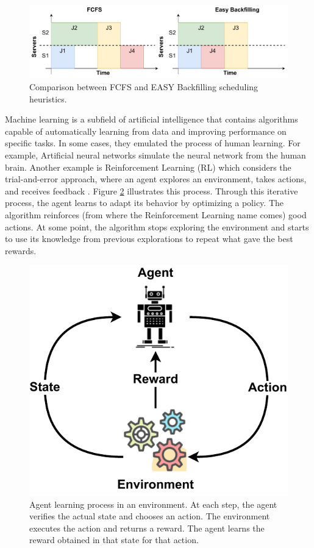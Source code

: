 \begin{figure}[!htb]
    \centering
    \includegraphics[scale=0.6]{Images/Related_works/backfilling.pdf}
    \caption{Comparison between FCFS and EASY Backfilling scheduling heuristics.}
    \label{fig:backfilling}
\end{figure}

Machine learning is a subfield of artificial intelligence that contains algorithms capable of automatically learning from data and improving performance on specific tasks. In some cases, they emulated the process of human learning. For example, Artificial neural networks simulate the neural network from the human brain. Another example is Reinforcement Learning (RL) which considers the trial-and-error approach, where an agent explores an environment, takes actions, and receives feedback \cite{kaelbling1996reinforcement}. Figure \ref{fig:reinforcement} illustrates this process. Through this iterative process, the agent learns to adapt its behavior by optimizing a policy. The algorithm reinforces (from where the Reinforcement Learning name comes) good actions. At some point, the algorithm stops exploring the environment and starts to use its knowledge from previous explorations to repeat what gave the best rewards. 

\begin{figure}[!htb]
    \centering
    \includegraphics[scale=0.6]{Images/Related_works/Reinforcement_learning.pdf}
    \caption{Agent learning process in an environment. At each step, the agent verifies the actual state and chooses an action. The environment executes the action and returns a reward. The agent learns the reward obtained in that state for that action.}
    \label{fig:reinforcement}
\end{figure}

